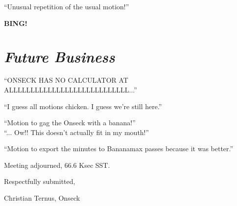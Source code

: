 \documentclass[10pt]{article}
\newcommand{\bing}{{\bf BING!} }
\newcommand{\goto}[1]{\bing \vskip 12pt \section*{{\em{#1}}}}
\begin{document}
``Unusual repetition of the usual motion!''

\goto{Future Business}

``ONSECK HAS NO CALCULATOR AT ALLLLLLLLLLLLLLLLLLLLLLLLLLLL...''

``I guess all motions chicken.  I guess we're still here.''

``Motion to gag the Onseck with a banana!''\\
``... Ow!! This doesn't actually fit in my mouth!''

``Motion to export the minutes to Bananamax passes because it was better.''

\noindent
Meeting adjourned, 66.6 Ksec SST.

\vspace{18pt}

\centerline{Respectfully submitted,}
\centerline{Christian Ternus, Onseck}
\end{document}
